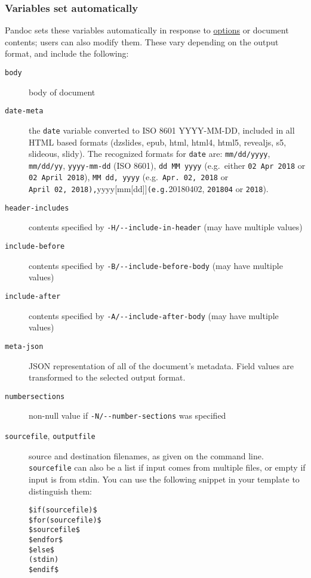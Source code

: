 \documentclass[
]{article}
\begin{document}
\hypertarget{variables-set-automatically}{%
\subsubsection{Variables set
automatically}\label{variables-set-automatically}}

Pandoc sets these variables automatically in response to
\protect\hyperlink{options}{options} or document contents; users can
also modify them. These vary depending on the output format, and include
the following:

\begin{description}
\item[\texttt{body}]
body of document
\item[\texttt{date-meta}]
the \texttt{date} variable converted to ISO 8601 YYYY-MM-DD, included in
all HTML based formats (dzslides, epub, html, html4, html5, revealjs,
s5, slideous, slidy). The recognized formats for \texttt{date} are:
\texttt{mm/dd/yyyy}, \texttt{mm/dd/yy}, \texttt{yyyy-mm-dd} (ISO 8601),
\texttt{dd\ MM\ yyyy} (e.g.~either \texttt{02\ Apr\ 2018} or
\texttt{02\ April\ 2018}), \texttt{MM\ dd,\ yyyy}
(e.g.~\texttt{Apr.\ 02,\ 2018} or
\texttt{April\ 02,\ 2018),}yyyy{[}mm{[}dd{]}{]}\texttt{(e.g.}20180402,
\texttt{201804} or \texttt{2018}).
\item[\texttt{header-includes}]
contents specified by \texttt{-H/-\/-include-in-header} (may have
multiple values)
\item[\texttt{include-before}]
contents specified by \texttt{-B/-\/-include-before-body} (may have
multiple values)
\item[\texttt{include-after}]
contents specified by \texttt{-A/-\/-include-after-body} (may have
multiple values)
\item[\texttt{meta-json}]
JSON representation of all of the document's metadata. Field values are
transformed to the selected output format.
\item[\texttt{numbersections}]
non-null value if \texttt{-N/-\/-number-sections} was specified
\item[\texttt{sourcefile}, \texttt{outputfile}]
source and destination filenames, as given on the command line.
\texttt{sourcefile} can also be a list if input comes from multiple
files, or empty if input is from stdin. You can use the following
snippet in your template to distinguish them:

\begin{verbatim}
$if(sourcefile)$
$for(sourcefile)$
$sourcefile$
$endfor$
$else$
(stdin)
$endif$
\end{verbatim}


\end{description}
\end{document}
